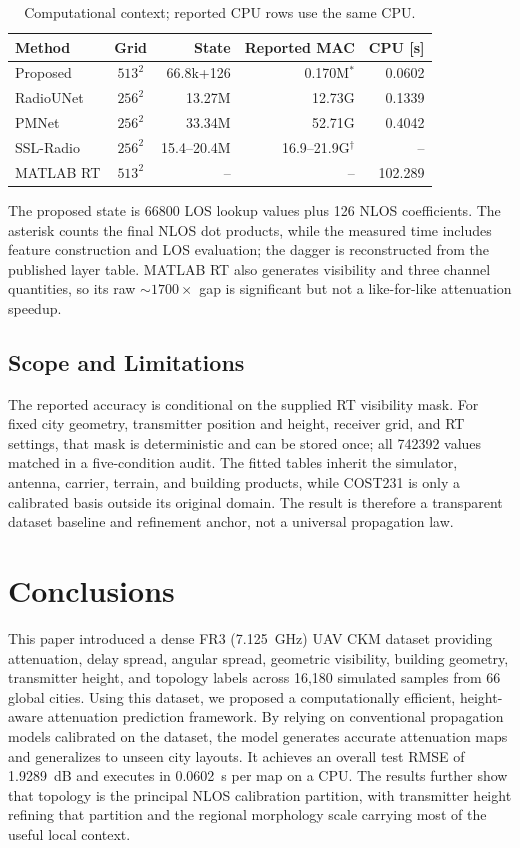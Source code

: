 \documentclass[10pt,conference,letterpaper]{IEEEtran}
\begin{document}
\begin{table}[!t]
\centering
\caption{Computational context; reported CPU rows use the same CPU.}
\label{tab:compute}
\scriptsize
\setlength{\tabcolsep}{2.2pt}
\begin{tabular}{@{}lcrrr@{}}
\toprule
Method & Grid & State & Reported MAC & CPU [s] \\
\midrule
Proposed & $513^2$ & 66.8k+126 & 0.170M$^\ast$ & 0.0602 \\
RadioUNet~\cite{radiounet2020} & $256^2$ & 13.27M & 12.73G & 0.1339 \\
PMNet~\cite{pmnet2023} & $256^2$ & 33.34M & 52.71G & 0.4042 \\
SSL-Radio~\cite{sslradio2025} & $256^2$ & 15.4--20.4M & 16.9--21.9G$^\dagger$ & -- \\
MATLAB RT & $513^2$ & -- & -- & 102.289 \\
\bottomrule
\end{tabular}
\end{table}
The proposed state is 66800 LOS lookup values plus 126 NLOS coefficients. The
asterisk counts the final NLOS dot products, while the measured time includes
feature construction and LOS evaluation; the dagger is reconstructed from the
published layer table. MATLAB RT also generates visibility and three channel
quantities, so its raw $\sim1700\times$ gap is significant but not a like-for-like
attenuation speedup.

\subsection{Scope and Limitations}
The reported accuracy is conditional on the supplied RT visibility mask. For
fixed city geometry, transmitter position and height, receiver grid, and RT
settings, that mask is deterministic and can be stored once; all 742392 values
matched in a five-condition audit. The fitted tables inherit the simulator,
antenna, carrier, terrain, and building products, while COST231 is only a
calibrated basis outside its original domain. The result is therefore a
transparent dataset baseline and refinement anchor, not a universal propagation
law.

\section{Conclusions}\label{sec:conclusions}
This paper introduced a dense FR3 (\SI{7.125}{GHz}) UAV CKM dataset providing
attenuation, delay spread, angular spread, geometric visibility, building
geometry, transmitter height, and topology labels across 16,180 simulated
samples from 66 global cities. Using this dataset, we proposed a computationally
efficient, height-aware attenuation prediction framework. By relying on
conventional propagation models calibrated on the dataset, the model generates
accurate attenuation maps and generalizes to unseen city layouts. It achieves
an overall test RMSE of \SI{1.9289}{dB} and executes in \SI{0.0602}{s} per map
on a CPU. The results further show that topology is the principal NLOS
calibration partition, with transmitter height refining that partition and the
regional morphology scale carrying most of the useful local context.
\end{document}
